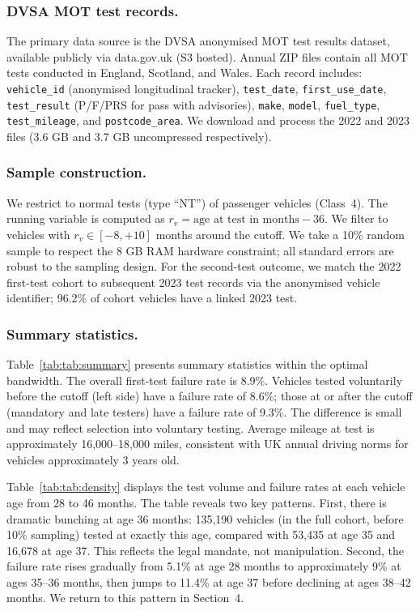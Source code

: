 \documentclass[12pt]{article}
\begin{document}
\subsubsection*{DVSA MOT test records.}
The primary data source is the DVSA anonymised MOT test results dataset, available publicly via data.gov.uk (S3 hosted). Annual ZIP files contain all MOT tests conducted in England, Scotland, and Wales. Each record includes: \texttt{vehicle\_id} (anonymised longitudinal tracker), \texttt{test\_date}, \texttt{first\_use\_date}, \texttt{test\_result} (P/F/PRS for pass with advisories), \texttt{make}, \texttt{model}, \texttt{fuel\_type}, \texttt{test\_mileage}, and \texttt{postcode\_area}. We download and process the 2022 and 2023 files (3.6 GB and 3.7 GB uncompressed respectively).

\subsubsection*{Sample construction.}
We restrict to normal tests (type ``NT'') of passenger vehicles (Class~4). The running variable is computed as $r_v = \text{age at test in months} - 36$. We filter to vehicles with $r_v \in [-8, +10]$ months around the cutoff. We take a 10\% random sample to respect the 8 GB RAM hardware constraint; all standard errors are robust to the sampling design. For the second-test outcome, we match the 2022 first-test cohort to subsequent 2023 test records via the anonymised vehicle identifier; 96.2\% of cohort vehicles have a linked 2023 test.

\subsubsection*{Summary statistics.}
Table~\ref{tab:tab:summary} presents summary statistics within the optimal bandwidth. The overall first-test failure rate is 8.9\%. Vehicles tested voluntarily before the cutoff (left side) have a failure rate of 8.6\%; those at or after the cutoff (mandatory and late testers) have a failure rate of 9.3\%. The difference is small and may reflect selection into voluntary testing. Average mileage at test is approximately 16,000--18,000 miles, consistent with UK annual driving norms for vehicles approximately 3 years old.



Table~\ref{tab:tab:density} displays the test volume and failure rates at each vehicle age from 28 to 46 months. The table reveals two key patterns. First, there is dramatic bunching at age 36 months: 135,190 vehicles (in the full cohort, before 10\% sampling) tested at exactly this age, compared with 53,435 at age 35 and 16,678 at age 37. This reflects the legal mandate, not manipulation. Second, the failure rate rises gradually from 5.1\% at age 28 months to approximately 9\% at ages 35--36 months, then jumps to 11.4\% at age 37 before declining at ages 38--42 months. We return to this pattern in Section~4.
\end{document}
